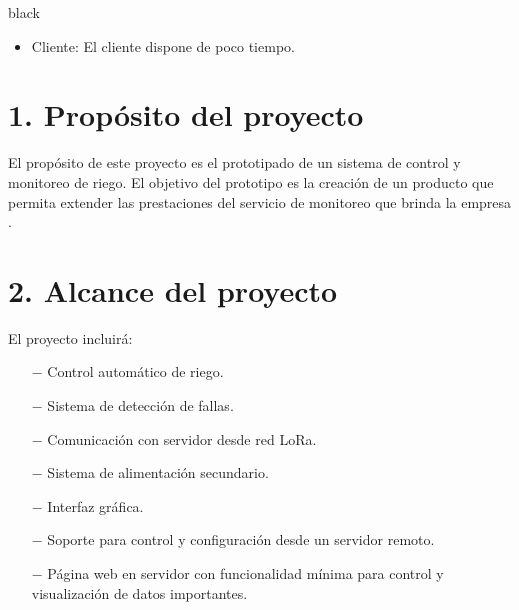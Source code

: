 \documentclass[11pt]{charter}
\begin{document}
\begin{consigna}{black}
 
\begin{itemize}
\item Cliente: El cliente dispone de poco tiempo. 
\end{itemize}

\end{consigna}

\clearpage

\section{1. Propósito del proyecto}
\label{sec:proposito}
El propósito de este proyecto es el prototipado de un sistema de control y monitoreo de riego. El objetivo del prototipo es la creación de un producto que permita extender las prestaciones  del servicio de monitoreo que brinda la empresa \empclientename.




\section{2. Alcance del proyecto}
\label{sec:alcance}

El proyecto incluirá:
\begin{itemize}
 \item[$-$] Control automático de riego.
\item[$-$] Sistema de detección de fallas.
\item[$-$] Comunicación con servidor desde red LoRa.
\item[$-$] Sistema de alimentación secundario.
\item[$-$] Interfaz gráfica.
\item[$-$] Soporte para control y configuración desde un servidor remoto.
\item[$-$] Página web en servidor con funcionalidad mínima para control y visualización de datos importantes.
\end{itemize}
\end{document}
